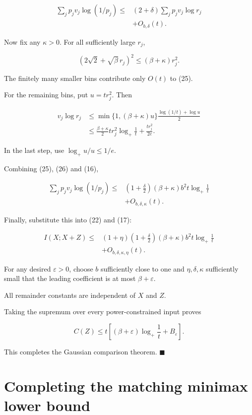 \documentclass[11pt]{article}
\begin{document}
\[
\begin{aligned}
\sum_jp_jv_j\log(1/p_j)
\leq{}&(2+\delta)\sum_jp_jv_j\log r_j\\
&+O_{b,\delta}(t).
\end{aligned}
\tag{25}
\]

Now fix any \(\kappa>0\). For all sufficiently large \(r_j\),

\[
(2\sqrt2+\sqrt\beta\,r_j)^2
\leq(\beta+\kappa)r_j^2.
\]

The finitely many smaller bins contribute only \(O(t)\) to (25).

For the remaining bins, put \(u=tr_j^2\). Then

\[
\begin{aligned}
v_j\log r_j
&\leq
\min\{1,(\beta+\kappa)u\}
\frac{\log(1/t)+\log u}{2}\\
&\leq
\frac{\beta+\kappa}{2}
tr_j^2\log_+\frac1t
+\frac{tr_j^2}{2e}.
\end{aligned}
\tag{26}
\]

In the last step, use \(\log_+u/u\leq1/e\).

Combining (25), (26) and (16),

\[
\begin{aligned}
\sum_jp_jv_j\log(1/p_j)
\leq{}&
\left(1+\frac\delta2\right)
(\beta+\kappa)b^2
t\log_+\frac1t\\
&+O_{b,\delta,\kappa}(t).
\end{aligned}
\tag{27}
\]

Finally, substitute this into (22) and (17):

\[
\begin{aligned}
I(X;X+Z)
\leq{}&
(1+\eta)
\left(1+\frac\delta2\right)
(\beta+\kappa)b^2
t\log_+\frac1t\\
&+O_{b,\delta,\kappa,\eta}(t).
\end{aligned}
\]

For any desired \(\varepsilon>0\), choose \(b\) sufficiently close to one and \(\eta,\delta,\kappa\) sufficiently small that the leading coefficient is at most \(\beta+\varepsilon\).

All remainder constants are independent of \(X\) and \(Z\).

Taking the supremum over every power-constrained input proves

\[
\boxed{
C(Z)\leq
t\left[
(\beta+\varepsilon)\log_+\frac1t
+B_\varepsilon
\right].
}
\]

This completes the Gaussian comparison theorem. \(\blacksquare\)

\section{Completing the matching minimax lower bound}
\end{document}
